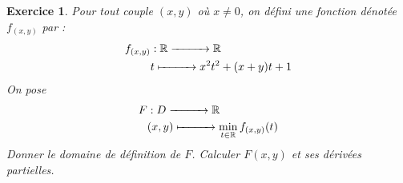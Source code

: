 \documentclass[10pt]{article}
\theoremstyle{frenchstyle}
\newtheorem{exercice}{Exercice}
\newcommand{\R}{\mathbb{R}}
\begin{document}
\newpage

\begin{exercice}
	Pour tout couple $(x, y)$ où $x \neq 0$, on défini une fonction dénotée $f_{(x,y)}$ par :
	\begin{align*}
		f_{(x,y)} & : \R \xrightarrow{\hspace*{1cm}} \R            \\
		          & t \xmapsto{\hspace*{1cm}} x^2 t^2 + (x+y)t + 1
	\end{align*}
	On pose
	\begin{align*}
		F & : D \xrightarrow{\hspace*{1cm}} \R                         \\
		  & (x,y) \xmapsto{\hspace*{1cm}} \min_{t \in \R} f_{(x,y)}(t)
	\end{align*}
	Donner le domaine de définition de $F$. Calculer $F(x, y)$ et ses dérivées partielles.
\end{exercice}
\end{document}
